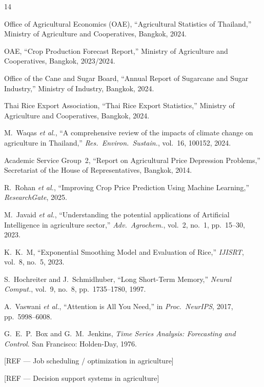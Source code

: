 \documentclass[conference]{IEEEtran}
\begin{document}
\begin{thebibliography}{14}

Office of Agricultural Economics (OAE), ``Agricultural Statistics of Thailand,'' Ministry of Agriculture and Cooperatives, Bangkok, 2024.

OAE, ``Crop Production Forecast Report,'' Ministry of Agriculture and Cooperatives, Bangkok, 2023/2024.

Office of the Cane and Sugar Board, ``Annual Report of Sugarcane and Sugar Industry,'' Ministry of Industry, Bangkok, 2024.

Thai Rice Export Association, ``Thai Rice Export Statistics,'' Ministry of Agriculture and Cooperatives, Bangkok, 2024.

M.~Waqas \textit{et al.}, ``A comprehensive review of the impacts of climate change on agriculture in Thailand,'' \textit{Res.\ Environ.\ Sustain.}, vol.~16, 100152, 2024.

Academic Service Group~2, ``Report on Agricultural Price Depression Problems,'' Secretariat of the House of Representatives, Bangkok, 2014.

R.~Rohan \textit{et al.}, ``Improving Crop Price Prediction Using Machine Learning,'' \textit{ResearchGate}, 2025.

M.~Javaid \textit{et al.}, ``Understanding the potential applications of Artificial Intelligence in agriculture sector,'' \textit{Adv.\ Agrochem.}, vol.~2, no.~1, pp.~15--30, 2023.

K.~K.~M, ``Exponential Smoothing Model and Evaluation of Rice,'' \textit{IJISRT}, vol.~8, no.~5, 2023.

S.~Hochreiter and J.~Schmidhuber, ``Long Short-Term Memory,'' \textit{Neural Comput.}, vol.~9, no.~8, pp.~1735--1780, 1997.

A.~Vaswani \textit{et al.}, ``Attention is All You Need,'' in \textit{Proc.\ NeurIPS}, 2017, pp.~5998--6008.

G.~E.~P.~Box and G.~M.~Jenkins, \textit{Time Series Analysis: Forecasting and Control}. San Francisco: Holden-Day, 1976.

[REF --- Job scheduling / optimization in agriculture]

[REF --- Decision support systems in agriculture]

\end{thebibliography}
\end{document}
